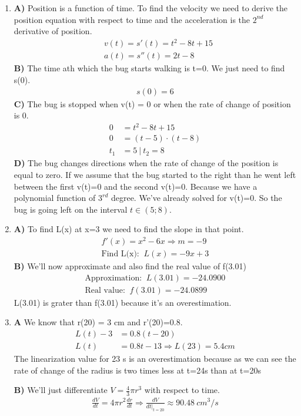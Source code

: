 \documentclass[13pt, a4paper, twoside]{article}
\begin{document}
\begin{enumerate}
\item \textbf{A)} Position is a function of time. To find the velocity we need to 
derive the position equation with respect to time and the acceleration is the $2^{nd}$
derivative of position.
\begin{align*}
    &v(t) = s'(t) = t^2 - 8t + 15\\
    &a(t) = s''(t) = 2t - 8
\end{align*}
\textbf{B)} The time ath which the bug starts walking is t=0. We just need to find s(0).
\begin{align*}
    s(0) = 6
\end{align*}
\textbf{C)} The bug is stopped when v(t) = 0 or when the rate of change of position is 0.
\begin{align*}
    0 &= t^2 - 8t + 15 \\
    0 &= (t-5)\cdot (t-8) \\
    t_1 &= 5 \:|\: t_2 = 8
\end{align*}
\textbf{D)} The bug changes directions when the rate of change of the position is equal to 
zero. If we assume that the bug started to the right than he went left between the first v(t)=0
and the second v(t)=0. Because we have a polynomial function of $3^{rd}$ degree.
We've already solved for v(t)=0. So the bug is going left on the interval $t \in (5; 8)$.
\item \textbf{A)} To find L(x) at x=3 we need to find the slope in that point.
\begin{align*}
    f'(x) = x^2 - 6x \Rightarrow m = -9\\
    \text{Find L(x): } \: L(x) = -9x + 3 
\end{align*}
\textbf{B)} We'll now approximate and also find the real value of f(3.01)
\begin{align*}
    \text{Approximation: }\: L(3.01) = -24.0900\\
    \text{Real value: }\: f(3.01) = -24.0899
\end{align*}
L(3.01) is grater than f(3.01) because it's an overestimation.

\item \textbf{A} We know that r(20) = 3 cm and r'(20)=0.8.
\begin{align*}
    L(t)-3 &= 0.8(t-20) \\
    L(t) &= 0.8t - 13 \Rightarrow L(23) = 5.4 cm
\end{align*}
The linearization value for 23 s is an overestimation because as we can see the
rate of change of the radius is two times less at t=24s than at t=20s

\textbf{B)} We'll just differentiate $V=\frac{4}{3}\pi r^3$ with respect to time.
\begin{align*}
    \frac{dV}{dt} = 4\pi r^2 \frac{dr}{dt} \Rightarrow \frac{dV}{dt|_{t=20}} \approx 90.48\: cm^3/s
\end{align*}
\end{enumerate}
\end{document}
